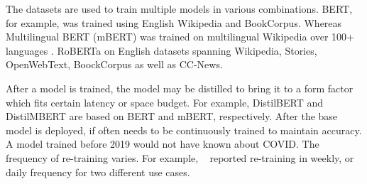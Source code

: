 {{        The datasets are used to train multiple models in various combinations. BERT, for example, was trained using English Wikipedia and BookCorpus. Whereas Multilingual BERT (mBERT) was trained on multilingual Wikipedia over 100+ languages \cite{Jindrich2019}. RoBERTa on English datasets spanning Wikipedia, Stories, OpenWebText, BoockCorpus as well as CC-News.

        After a model is trained, the model may be distilled to bring it to a form factor which fits certain latency or space budget. For example,  DistilBERT \cite{Sanh2019} and DistilMBERT are based on BERT and mBERT, respectively. After the base model is deployed, if often needs to be continuously trained to maintain accuracy. A model trained before 2019 would not have known about COVID. The frequency of re-training varies. For example, ~\cite{Wu2022} reported re-training in weekly, or daily frequency for two different use cases.
    }
}
